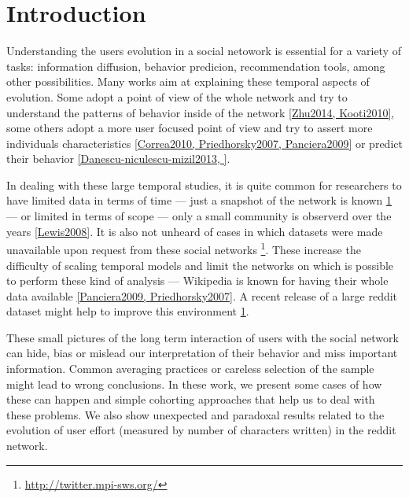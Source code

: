 \section{Introduction}


Understanding the users evolution in a social netowork is essential for a variety of tasks: information diffusion, behavior predicion, recommendation tools, among other possibilities. Many works aim at explaining these temporal aspects of evolution. Some adopt a point of view of the whole network and try to understand the patterns of behavior inside of the network \ref{Zhu2014, Kooti2010}, some others adopt a more user focused point of view and try to assert more individuals characteristics \ref{Correa2010, Priedhorsky2007, Panciera2009} or predict their behavior \ref{Danescu-niculescu-mizil2013, }.

In dealing with these large temporal studies, it is quite common for researchers to have limited data in terms of time --- just a snapshot of the network is known \ref{} --- or limited in terms of scope --- only a small community is observerd over the years \ref{Lewis2008}. It is also not unheard of cases in which datasets were made unavailable upon request from these social networks \footnote{\url{http://twitter.mpi-sws.org/}}. These increase the difficulty of scaling temporal models and limit the networks on which is possible to perform these kind of analysis --- Wikipedia is known for having their whole data available \ref{Panciera2009, Priedhorsky2007}. A recent release of a large reddit dataset might help to improve this environment \ref{}.

These small pictures of the long term interaction of users with the social network can hide, bias or mislead our interpretation of their behavior and miss important information. Common averaging practices or careless selection of the sample might lead to wrong conclusions. In these work, we present some cases of how these can happen and simple cohorting approaches that help us to deal with these problems. We also show unexpected and paradoxal results related to the evolution of user effort (measured by number of characters written) in the reddit network.